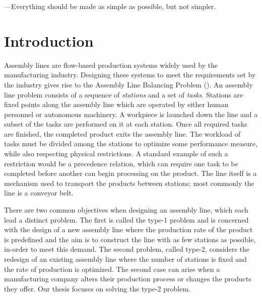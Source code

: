 
\begin{savequote}%
---Everything should be made as simple as possible, but not simpler.
\end{savequote}

\chapter{Introduction}
\label{chap:intro}
Assembly lines are flow-based production systems widely used by
the manufacturing industry.
Designing these systems to meet the requirements set
by the industry gives rise to the Assembly Line
Balancing Problem (\albp{}).
An assembly line problem consists of a sequence
of \emph{stations} and a set of \emph{tasks}.
Stations are fixed points along the assembly
line which are operated by either human personnel
or autonomous machinery.
A workpiece is launched down the line and 
a subset of the tasks are performed on it at each station.
Once all required tasks are finished, the completed product
exits the assembly line.
The workload of tasks must be divided among the stations
to optimize some performance measure,
while also respecting physical restrictions.
A standard example of such a restriction would be a
precedence relation, which can require
one task to be completed before another can begin
processing on the product.
The line itself is a mechanism used to
transport the products between stations;
most commonly the line is a conveyor belt.

There are two common objectives when designing an assembly
line, which each lead a distinct problem.
The first is called the type-1 problem and is concerned with
the design of a new assembly line where the production rate
of the product is predefined and the aim is to construct the line
with as few stations as possible, in-order to meet this demand.
The second problem, called type-2, considers the redesign of an existing
assembly line where the number of stations is fixed and the rate
of production is optimized.
The second case can arise when a manufacturing company alters their
production process or changes the products they offer.
Our thesis focuses on solving the type-2 problem.

